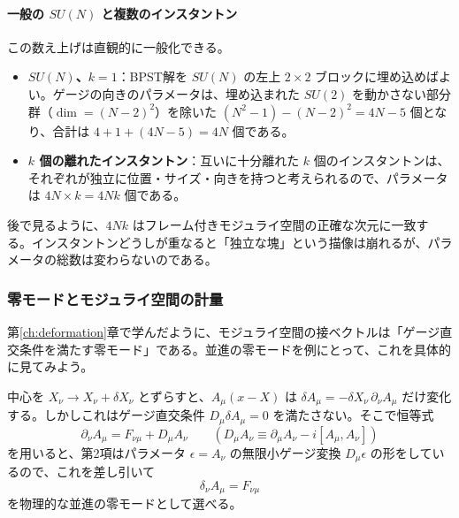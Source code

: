 \documentclass[uplatex, dvipdfmx, book]{jsbook}
\let\origsubsubsection\subsubsection
\renewcommand{\subsection}{\origsubsubsection}
\renewcommand{\subsubsection}{\paragraph}
\begin{document}
\paragraph{一般の $SU(N)$ と複数のインスタントン}
この数え上げは直観的に一般化できる。
\begin{itemize}
    \item \textbf{$SU(N)$、$k = 1$}：BPST解を $SU(N)$ の左上 $2 \times 2$ ブロックに埋め込めばよい。ゲージの向きのパラメータは、埋め込まれた $SU(2)$ を動かさない部分群（$\dim = (N-2)^2$）を除いた $(N^2 - 1) - (N-2)^2 = 4N - 5$ 個となり、合計は $4 + 1 + (4N - 5) = 4N$ 個である。
    \item \textbf{$k$ 個の離れたインスタントン}：互いに十分離れた $k$ 個のインスタントンは、それぞれが独立に位置・サイズ・向きを持つと考えられるので、パラメータは $4N \times k = 4Nk$ 個である。
\end{itemize}
後で見るように、$4Nk$ はフレーム付きモジュライ空間の正確な次元に一致する。インスタントンどうしが重なると「独立な塊」という描像は崩れるが、パラメータの総数は変わらないのである。

\subsection{零モードとモジュライ空間の計量}

第\ref{ch:deformation}章で学んだように、モジュライ空間の接ベクトルは「ゲージ直交条件を満たす零モード」である。並進の零モードを例にとって、これを具体的に見てみよう。

中心を $X_\nu \to X_\nu + \delta X_\nu$ とずらすと、$A_\mu(x - X)$ は $\delta A_\mu = -\delta X_\nu\,\partial_\nu A_\mu$ だけ変化する。しかしこれはゲージ直交条件 $D_\mu \delta A_\mu = 0$ を満たさない。そこで恒等式
\begin{equation}
    \partial_\nu A_\mu = F_{\nu\mu} + D_\mu A_\nu \qquad \left( D_\mu A_\nu \equiv \partial_\mu A_\nu - i[A_\mu, A_\nu] \right)
\end{equation}
を用いると、第2項はパラメータ $\epsilon = A_\nu$ の無限小ゲージ変換 $D_\mu\epsilon$ の形をしているので、これを差し引いて
\begin{equation}
    \delta_\nu A_\mu = F_{\nu\mu}
\end{equation}
を物理的な並進の零モードとして選べる。
\end{document}
